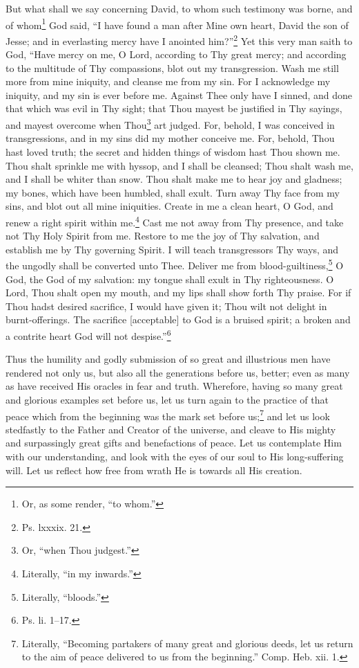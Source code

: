 But what shall we say concerning David, to whom such testimony was borne, and of whom\footnote{Or, as some render, “to whom.”} God said, “I have found a man after Mine own heart, David the son of Jesse; and in everlasting mercy have I anointed him?”\footnote{Ps. lxxxix. 21.} Yet this very man saith to God, “Have mercy on me, O Lord, according to Thy great mercy; and according to the multitude of Thy compassions, blot out my transgression. Wash me still more from mine iniquity, and cleanse me from my sin. For I acknowledge my iniquity, and my sin is ever before me. Against Thee only have I sinned, and done that which was evil in Thy sight; that Thou mayest be justified in Thy sayings, and mayest overcome when Thou\footnote{Or, “when Thou judgest.”} art judged. For, behold, I was conceived in transgressions, and in my sins did my mother conceive me. For, behold, Thou hast loved truth; the secret and hidden things of wisdom hast Thou shown me. Thou shalt sprinkle me with hyssop, and I shall be cleansed; Thou shalt wash me, and I shall be whiter than snow. Thou shalt make me to hear joy and gladness; my bones, which have been humbled, shall exult. Turn away Thy face from my sins, and blot out all mine iniquities. Create in me a clean heart, O God, and renew a right spirit within me.\footnote{Literally, “in my inwards.”} Cast me not away from Thy presence, and take not Thy Holy Spirit from me. Restore to me the joy of Thy salvation, and establish me by Thy governing Spirit. I will teach transgressors Thy ways, and the ungodly shall be converted unto Thee. Deliver me from blood-guiltiness,\footnote{Literally, “bloods.”} O God, the God of my salvation: my tongue shall exult in Thy righteousness. O Lord, Thou shalt open my mouth, and my lips shall show forth Thy praise. For if Thou hadst desired sacrifice, I would have given it; Thou wilt not delight in burnt-offerings. The sacrifice [acceptable] to God is a bruised spirit; a broken and a contrite heart God will not despise.”\footnote{Ps. li. 1–17.}


Thus the humility and godly submission of so great and illustrious men have rendered not only us, but also all the generations before us, better; even as many as have received His oracles in fear and truth. Wherefore, having so many great and glorious examples set before us, let us turn again to the practice of that peace which from the beginning was the mark set before us;\footnote{Literally, “Becoming partakers of many great and glorious deeds, let us return to the aim of peace delivered to us from the beginning.” Comp. Heb. xii. 1.} and let us look stedfastly to the Father and Creator of the universe, and cleave to His mighty and surpassingly great gifts and benefactions of peace. Let us contemplate Him with our understanding, and look with the eyes of our soul to His long-suffering will. Let us reflect how free from wrath He is towards all His creation.

